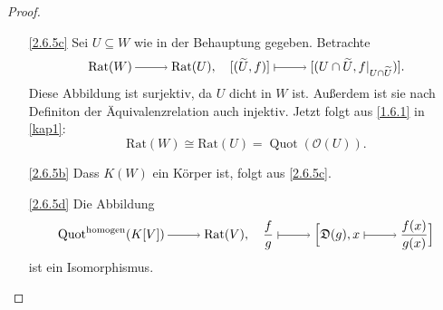 \documentclass[a4paper,12pt,index=toc]{scrbook}
\theoremstyle{keinenummern} %
\def\O{\mathcal{O}}
\newcommand{\D}{\mathfrak{D}}
\newcommand{\Rat}{\mathrm{Rat}}
\newcommand{\Quot}{\operatorname{Quot}}
\newcommand{\restrict}[1]{|_{#1}}
\newcommand{\schlange}[1]{\widetilde{#1}}
\begin{document}
\begin{proof}
\begin{enumerate} 
  \item[\ref{2.6.5c}]  Sei $U\subseteq W$ wie in der Behauptung gegeben. Betrachte
  \begin{equation*}\Rat(W)\ra \Rat(U), \quad [(\schlange{U},f)]\mapsto\relax [(U\cap \schlange{U},f\restrict{U\cap \schlange{U}})].\end{equation*}
Diese Abbildung ist surjektiv, da $U$ dicht in $W$ ist. Außerdem ist sie nach Definiton der Äquivalenzrelation auch injektiv. Jetzt folgt aus \cref{1.6.1} in \cref{kap1}:
\begin{equation*}\Rat(W)\cong \Rat(U)=\Quot(\O(U)).\end{equation*}
  \item[\ref{2.6.5b}] Dass $K(W)$ ein Körper ist, folgt aus \ref{2.6.5c}.
  \item[\ref{2.6.5d}] Die Abbildung 
\begin{equation*}\Quot^{\mathrm{homogen}}(K[V])\ra \Rat(V), \quad \frac{f}{g} \mapsto \Bigl[\D(g),x\mapsto \frac{f(x)}{g(x)}\Bigr]\end{equation*}
ist ein Isomorphismus.
\end{enumerate}
\end{proof}
\settowidth{}
\newlength\zweitebreite
\settowidth{}
\end{document}
